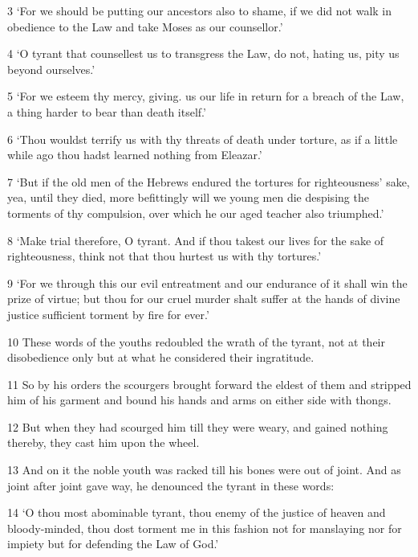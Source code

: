\par 3 ‘For we should be putting our ancestors also to shame, if we did not walk in obedience to the Law and take Moses as our counsellor.’

\par 4 ‘O tyrant that counsellest us to transgress the Law, do not, hating us, pity us beyond ourselves.’

\par 5 ‘For we esteem thy mercy, giving. us our life in return for a breach of the Law, a thing harder to bear than death itself.’

\par 6 ‘Thou wouldst terrify us with thy threats of death under torture, as if a little while ago thou hadst learned nothing from Eleazar.’

\par 7 ‘But if the old men of the Hebrews endured the tortures for righteousness' sake, yea, until they died, more befittingly will we young men die despising the torments of thy compulsion, over which he our aged teacher also triumphed.’

\par 8 ‘Make trial therefore, O tyrant. And if thou takest our lives for the sake of righteousness, think not that thou hurtest us with thy tortures.’

\par 9 ‘For we through this our evil entreatment and our endurance of it shall win the prize of virtue; but thou for our cruel murder shalt suffer at the hands of divine justice sufficient torment by fire for ever.’

\par 10 These words of the youths redoubled the wrath of the tyrant, not at their disobedience only but at what he considered their ingratitude.

\par 11 So by his orders the scourgers brought forward the eldest of them and stripped him of his garment and bound his hands and arms on either side with thongs.

\par 12 But when they had scourged him till they were weary, and gained nothing thereby, they cast him upon the wheel.

\par 13 And on it the noble youth was racked till his bones were out of joint. And as joint after joint gave way, he denounced the tyrant in these words:

\par 14 ‘O thou most abominable tyrant, thou enemy of the justice of heaven and bloody-minded, thou dost torment me in this fashion not for manslaying nor for impiety but for defending the Law of God.’

